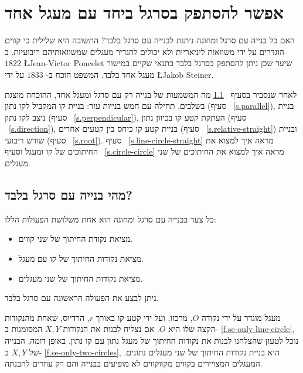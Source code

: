 
\chapter{אפשר להסתפק בסרגל ביחד עם מעגל אחד}\label{c.straightedge}


האם כל בנייה עם סרגל ומחוגה ניתנת לבנייה עם סרגל בלבד? התשובה היא שלילית כי קווים הוגדרים על ידי משוואות ליניאריות ולא יכולים להגדיר מעגלים שמשוואותיהם ריבועיות. ב-%
$1822$
\L{Jean-Victor Poncelet}
שיער שכן ניתן להסתפק בסרגל בלבד בתנאי שקיים במישור מעגל אחד בלבד. המשפט הוכח ב-%
$1833$
על ידי
\L{Jakob Steiner}.

לאחר שנסביר בסעיף%
~\ref{s.se-what}
מה המשמעות של בנייה רק עם סרגל ומעגל אחד, ההוכחה מוצגת בשלבים, תחילה עם חמש בנייות עזר: בניית קו המקביל לקו נתון (סעיף%
~\ref{s.parallel}),
בניית ניצב לקו נתון (סעיף%
~\ref{s.perpendicular}),
העתקת קטע קו בכיוון נתון (סעיף%
~\ref{s.direction}), 
בניית קטע קו כיחס בין קטעים אחרים (סעיף%
~\ref{s.relative-straight})
ובניית שורש ריבועי (סעיף%
~\ref{s.root}).
סעיף%
~\ref{s.line-circle-straight}
מראה איך למצוא את החיתוכים של קו ומעגל וסעיף%
~\ref{s.circle-circle}
מראה איך למצוא את החיתוכים של שני מעגלים.


\section{מהי בנייה עם סרגל בלבד?}\label{s.se-what}

כל צעד בבנייה עם סרגל ומחוגה הוא אחת משלושת הפעולות הללו:
\begin{itemize}
\setlength{\itemsep}{0pt}
\item
מציאת נקודת החיתוך של שני קווים.
\item
מציאת נקודות החיתוך של קו עם מעגל.
\item
מציאת נקודות החיתוך של שני מעגלים.
\end{itemize}
ניתן לבצע את הפעולה הראשונה עם סרגל בלבד.

מעגל מוגדר על ידי נקודה
$O$,
מרכזו, ועל ידי קטע קו באורך
$r$,
הרדיוס, שאחת מהנקודות הקצה שלו היא
$O$.
אם נצליח לבנות את הנקודות
$X,Y$
המסומנות ב-%
\ref{f.se-only-line-circle},
נוכל לטעון שהצלחנו לבנות את נקודות החיתוך של מעגל נתון עם קו נתון. באופן דומה, הבנייה של
$X,Y$
ב-%
\ref{f.se-only-two-circles},
היא בניית נקודות החיתוך של שני מעגלים נתונים. המעגלים המצויירים בקווים מקווקווים לא מופיעים בבנייה והם רק עוזרים להבנתה.

